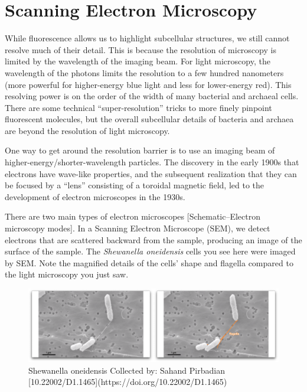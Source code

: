 \documentclass[]{tufte-book}
\begin{document}
\section{Scanning Electron
Microscopy}\label{scanning-electron-microscopy}

While fluorescence allows us to highlight subcellular structures, we
still cannot resolve much of their detail. This is because the
resolution of microscopy is limited by the wavelength of the imaging
beam. For light microscopy, the wavelength of the photons limits the
resolution to a few hundred nanometers (more powerful for higher-energy
blue light and less for lower-energy red). This resolving power is on
the order of the width of many bacterial and archaeal cells. There are
some technical ``super-resolution'' tricks to more finely pinpoint
fluorescent molecules, but the overall subcellular details of bacteria
and archaea are beyond the resolution of light microscopy.

One way to get around the resolution barrier is to use an imaging beam
of higher-energy/shorter-wavelength particles. The discovery in the
early 1900s that electrons have wave-like properties, and the subsequent
realization that they can be focused by a ``lens'' consisting of a
toroidal magnetic field, led to the development of electron microscopes
in the 1930s.

There are two main types of electron microscopes {[}Schematic--Electron
microscopy modes{]}. In a Scanning Electron Microscope (SEM), we detect
electrons that are scattered backward from the sample, producing an
image of the surface of the sample. The \emph{Shewanella oneidensis}
cells you see here were imaged by SEM. Note the magnified details of the
cells' shape and flagella compared to the light microscopy you just saw.

\begin{figure}
\includegraphics{movie_stills/1_3} \caption[Shewanella oneidensis Collected by]{Shewanella oneidensis Collected by: Sahand Pirbadian [10.22002/D1.1465](https://doi.org/10.22002/D1.1465)}\label{fig:unnamed-chunk-5}
\end{figure}
\end{document}
